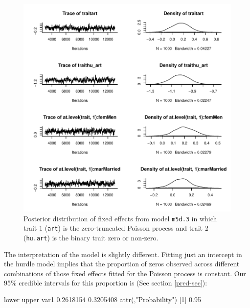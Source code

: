 \documentclass{article}
\begin{document}
\begin{figure}[!h]
\begin{center}
\includegraphics{Lecture5-046}
\end{center}
\caption{Posterior distribution of fixed effects from model \texttt{m5d.3} in which trait 1 (\texttt{art}) is the zero-truncated Poisson process and trait 2 (\texttt{hu.art}) is the binary trait zero or non-zero.}
\label{HU}
\end{figure}

The interpretation of the model is slightly different. Fitting just an intercept in the hurdle model implies that the proportion of zeros observed across different combinations of those fixed effects fitted for the Poisson process is constant. Our 95\% credible intervals for this proportion is (See section \ref{pred-sec}):

\begin{Schunk}
\begin{Soutput}
         lower     upper
var1 0.2618154 0.3205408
attr(,"Probability")
[1] 0.95
\end{Soutput}
\end{Schunk}
\end{document}
